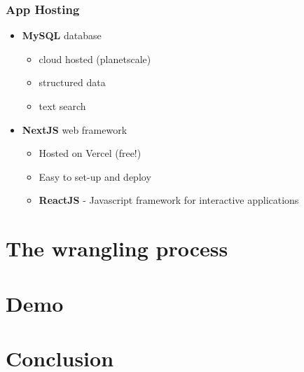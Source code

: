 \documentclass{beamer}
\newcommand{\prog}[1]{\textsf{\bfseries #1}}
\begin{document}
\begin{frame}
    \frametitle{App Hosting}

    \begin{itemize}
        \item \prog{MySQL} database
        \begin{itemize}
            \item cloud hosted (planetscale)
            \item structured data
            \item text search
        \end{itemize}
        \item \prog{NextJS} web framework
        \begin{itemize}
            \item Hosted on Vercel (free!)
            \item Easy to set-up and deploy
            \item \prog{ReactJS} - Javascript framework for interactive applications
        \end{itemize}
    \end{itemize}
\end{frame}

\section{The wrangling process}

\section{Demo}

\section{Conclusion}
\end{document}
